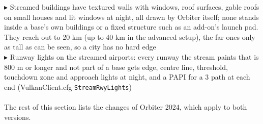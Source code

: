 \documentclass[Orbiter User Manual.tex]{subfiles}
\begin{document}
$\blacktriangleright$ Streamed buildings have textured walls with windows, roof surfaces, gable roofs on small houses and lit windows at night, all drawn by Orbiter itself; none stands inside a base's own buildings or a fixed structure such as an add-on's launch pad. They reach out to 20 km (up to 40 km in the advanced setup), the far ones only as tall as can be seen, so a city has no hard edge\\
$\blacktriangleright$ Runway lights on the streamed airports: every runway the stream paints that is 800 m or longer and not part of a base gets edge, centre line, threshold, touchdown zone and approach lights at night, and a PAPI for a 3\textdegree{} path at each end (VulkanClient.cfg \texttt{StreamRwyLights})\\
\\
The rest of this section lists the changes of Orbiter 2024, which apply to both versions.
\end{document}

